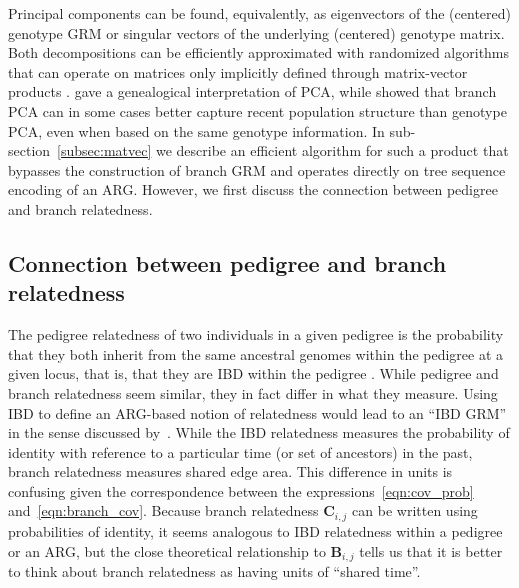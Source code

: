 Principal components can be found, equivalently, as
eigenvectors of the (centered) genotype GRM or
singular vectors of the underlying (centered) genotype matrix.
Both decompositions can be efficiently approximated with randomized algorithms that can operate on
matrices only implicitly defined through matrix-vector products \citep{halko2011findingstructure}.
\citet{mcvean2009genealogical} gave a genealogical interpretation of PCA, while
\citet{fan2022genealogical} showed that branch PCA can 
in some cases better capture recent population structure than genotype PCA,
even when based on the same genotype information.
In sub-section~\ref{subsec:matvec} we describe an efficient algorithm for
such a product that bypasses the construction of branch GRM
and operates directly on tree sequence encoding of an ARG.
However, we first discuss the connection between pedigree and branch relatedness.

\subsection{Connection between pedigree and branch relatedness}

The pedigree relatedness of two individuals in a given pedigree is
the probability that they both inherit from the same ancestral genomes within the pedigree
at a given locus,
that is, that they are IBD within the pedigree \citep{malecot1969mathemathics}.
%
While pedigree and branch relatedness seem similar,
they in fact differ in what they measure.
%
Using IBD to define an ARG-based notion of relatedness would lead to an ``IBD GRM''
in the sense discussed by~\citet{tsambos2022efficient}.
%
While the IBD relatedness measures the
probability of identity with reference to a particular time (or set of ancestors) in the past,
branch relatedness measures shared edge area.
%
This difference in units is confusing given the correspondence between
the expressions~\eqref{eqn:cov_prob} and~\eqref{eqn:branch_cov}.
%
Because branch relatedness $\mathbf{C}_{i,j}$ can be written using probabilities of identity,
it seems analogous to IBD relatedness within a pedigree or an ARG,
but the close theoretical relationship to $\mathbf{B}_{i,j}$
tells us that it is better to think about branch relatedness as having units of ``shared time''.

